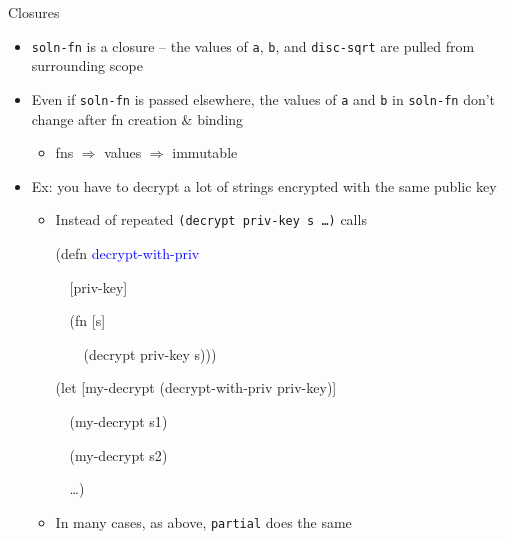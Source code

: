 \documentclass{beamer}
\begin{document}
\begin{frame}{Closures}
  \begin{itemize}
  \item \texttt{soln-fn} is a closure -- the values of
    \texttt{a}, \texttt{b}, and \texttt{disc-sqrt} are pulled from surrounding scope
  \item Even if \texttt{soln-fn} is passed elsewhere, the values of
    \texttt{a} and \texttt{b} in \texttt{soln-fn} don't change after fn creation \&
    binding 
    \begin{itemize}
    \item fns $\Rightarrow$ values $\Rightarrow$ immutable
    \end{itemize}
  \item Ex: you have to decrypt a lot of strings encrypted with the
    same public key
    \begin{itemize}
    \item Instead of repeated \texttt{(decrypt priv-key s \ldots)}
      calls\\
\begin{small}
{\ttfamily\color{black}
%
\textcolor[rgb]{0.54901963,0.54901963,0.54901963}{(}\textcolor[rgb]{0.49803922,0.0,0.49803922}{defn}
\textcolor{blue}{decrypt-with-priv}}

{\ttfamily\color{black}
\ \ [priv-key]}

{\ttfamily\color{black}
\ \ \textcolor[rgb]{0.54901963,0.54901963,0.54901963}{(}\textcolor[rgb]{0.49803922,0.0,0.49803922}{fn}
[s]}

{\ttfamily\color{black}
\ \ \ \ \textcolor[rgb]{0.54901963,0.54901963,0.54901963}{(}decrypt
priv-key s\textcolor[rgb]{0.54901963,0.54901963,0.54901963}{)))}}


\bigskip

{\ttfamily\color{black}
\textcolor[rgb]{0.54901963,0.54901963,0.54901963}{(}\textcolor[rgb]{0.49803922,0.0,0.49803922}{let}
[my-decrypt
\textcolor[rgb]{0.54901963,0.54901963,0.54901963}{(}decrypt-with-priv
priv-key\textcolor[rgb]{0.54901963,0.54901963,0.54901963}{)}]}

{\ttfamily\color{black}
\ \ \textcolor[rgb]{0.54901963,0.54901963,0.54901963}{(}my-decrypt
s1\textcolor[rgb]{0.54901963,0.54901963,0.54901963}{)}}

{\ttfamily\color{black}
\ \ \textcolor[rgb]{0.54901963,0.54901963,0.54901963}{(}my-decrypt
s2\textcolor[rgb]{0.54901963,0.54901963,0.54901963}{)}}

{\ttfamily\color{black}
\ \ \ldots\textcolor[rgb]{0.54901963,0.54901963,0.54901963}{)}}
\end{small}
    \item In many cases, as above, \texttt{partial} does the same
    \end{itemize}
  \end{itemize}
\end{frame}
\end{document}
